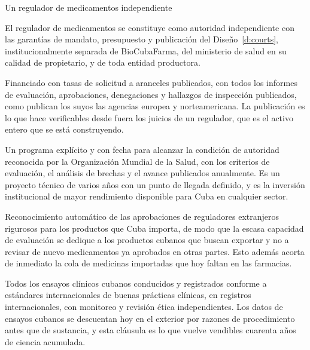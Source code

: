 \begin{design}{Un regulador de medicamentos independiente}
\label{d:cecmed}
\begin{rules}
 El regulador de medicamentos se constituye como autoridad independiente
con las garantías de mandato, presupuesto y publicación del Diseño~\ref{d:courts},
institucionalmente separada de BioCubaFarma, del ministerio de salud en su calidad de
propietario, y de toda entidad productora.

 Financiado con tasas de solicitud a aranceles
publicados, con todos los informes de evaluación, aprobaciones, denegaciones y hallazgos de
inspección publicados, como publican los suyos las agencias europea y norteamericana. La
publicación es lo que hace verificables desde fuera los juicios de un regulador, que es el
activo entero que se está construyendo.

 Un programa explícito y con fecha para alcanzar
la condición de autoridad reconocida por la Organización Mundial de la Salud, con los
criterios de evaluación, el análisis de brechas y el avance publicados anualmente. Es un
proyecto técnico de varios años con un punto de llegada definido, y es la inversión
institucional de mayor rendimiento disponible para Cuba en cualquier sector.

 Reconocimiento automático de las aprobaciones de reguladores
extranjeros rigurosos para los productos que Cuba importa, de modo que la escasa capacidad de
evaluación se dedique a los productos cubanos que buscan exportar y no a revisar de nuevo
medicamentos ya aprobados en otras partes. Esto además acorta de inmediato la cola de
medicinas importadas que hoy faltan en las farmacias.

 Todos los ensayos clínicos cubanos conducidos y
registrados conforme a estándares internacionales de buenas prácticas clínicas, en registros
internacionales, con monitoreo y revisión ética independientes. Los datos de ensayos cubanos
se descuentan hoy en el exterior por razones de procedimiento antes que de sustancia, y esta
cláusula es lo que vuelve vendibles cuarenta años de ciencia acumulada.
\end{rules}
\end{design}

